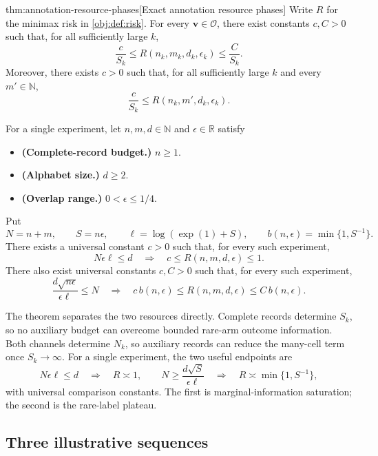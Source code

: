 \begin{theoremv}{thm:annotation-resource-phases}[Exact annotation resource phases]
Write \(R\) for the minimax risk in \cref{obj:def:risk}. For every \(\mathbf v\in\mathcal O\), there exist constants \(c,C>0\) such that, for all sufficiently large \(k\),
\[
\frac{c}{S_k}
\le R(n_k,m_k,d_k,\epsilon_k)
\le \frac{C}{S_k}.
\]
Moreover, there exists \(c>0\) such that, for all sufficiently large \(k\) and every \(m'\in\mathbb N\),
\[
\frac{c}{S_k}\le R(n_k,m',d_k,\epsilon_k).
\]

For a single experiment, let \(n,m,d\in\mathbb N\) and \(\epsilon\in\mathbb R\) satisfy
\begin{itemize}
\item \textbf{(Complete-record budget.)} \(n\ge1\).
\item \textbf{(Alphabet size.)} \(d\ge2\).
\item \textbf{(Overlap range.)} \(0<\epsilon\le1/4\).
\end{itemize}
Put
\[
N=n+m,\qquad S=n\epsilon,\qquad
\ell=\log(\exp(1)+S),\qquad
b(n,\epsilon)=\min\{1,S^{-1}\}.
\]
There exists a universal constant \(c>0\) such that, for every such experiment,
\[
N\epsilon\ell\le d
\quad\Longrightarrow\quad
c\le R(n,m,d,\epsilon)\le1.
\]
There also exist universal constants \(c,C>0\) such that, for every such experiment,
\[
\frac{d\sqrt{n\epsilon}}{\epsilon\ell}\le N
\quad\Longrightarrow\quad
c\,b(n,\epsilon)\le R(n,m,d,\epsilon)\le C\,b(n,\epsilon).
\]
\end{theoremv}

The theorem separates the two resources directly. Complete records determine \(S_k\), so no auxiliary budget can overcome bounded rare-arm outcome information. Both channels determine \(N_k\), so auxiliary records can reduce the many-cell term once \(S_k\to\infty\). For a single experiment, the two useful endpoints are
\[
N\epsilon\ell\le d
\quad\Longrightarrow\quad R\asymp1,
\qquad
N\ge \frac{d\sqrt S}{\epsilon\ell}
\quad\Longrightarrow\quad
R\asymp \min\{1,S^{-1}\},
\]
with universal comparison constants. The first is marginal-information saturation; the second is the rare-label plateau.

\subsection{Three illustrative sequences}

